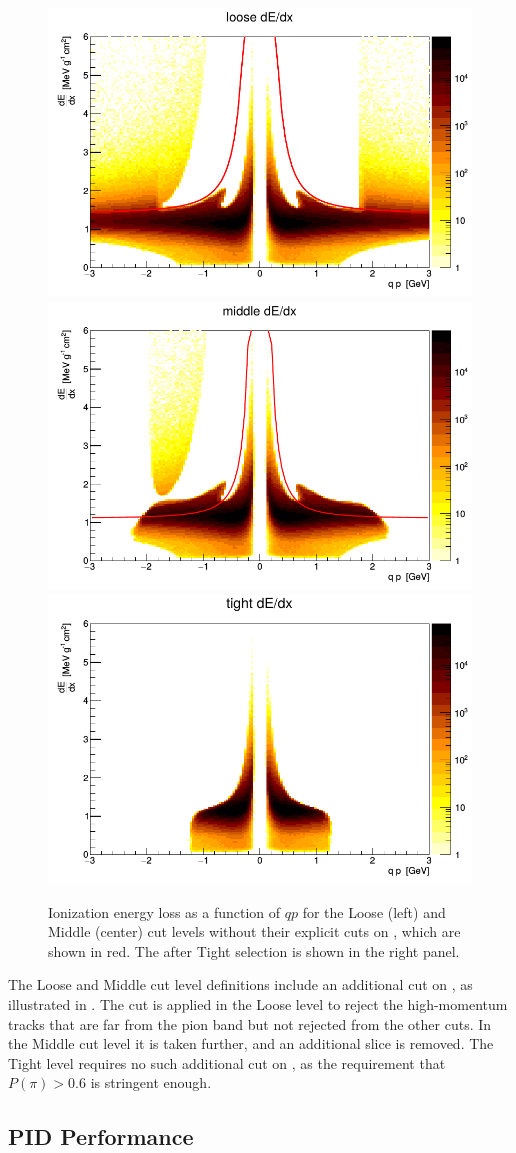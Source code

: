 \begin{figure}[t]
\includegraphics[width=.32\linewidth]{dedx_loose.png}
\includegraphics[width=.32\linewidth]{dedx_mid.png}
\includegraphics[width=.32\linewidth]{dedx_tight.png}
\caption{Ionization energy loss \dEdx as a function of $qp$ for the Loose (left) and Middle (center) cut levels without their explicit cuts on \dEdx, which are shown in red. The \dEdx after Tight selection is shown in the right panel.}
\label{fig:dedx}
\end{figure}

The Loose and Middle cut level definitions include an additional cut on \dEdx, as illustrated in .
The cut is applied in the Loose level to reject the high-momentum tracks that are far from the pion band but not rejected from the other cuts.
In the Middle cut level it is taken further, and an additional slice is removed.
The Tight level requires no such additional cut on \dEdx, as the requirement that $P(\pi) > 0.6$ is stringent enough.


\subsection{PID Performance}

